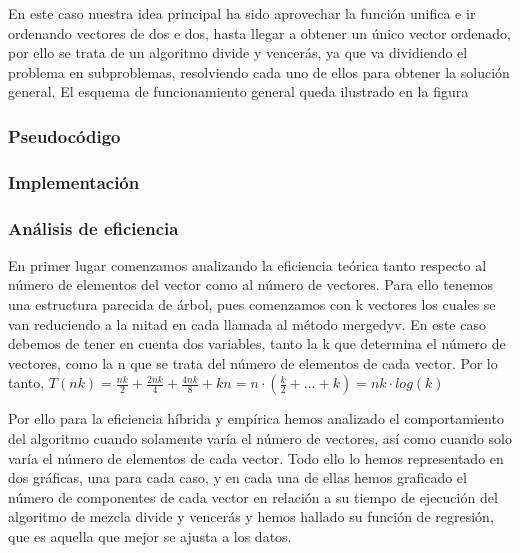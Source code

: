 En este caso nuestra idea principal ha sido aprovechar la función unifica e ir ordenando vectores de dos e dos,
hasta llegar a obtener un único vector ordenado, por ello se trata de un algoritmo divide y vencerás, ya que va dividiendo 
el problema en subproblemas, resolviendo cada uno de ellos para obtener la solución general. El esquema de 
funcionamiento general queda ilustrado en la figura 

\begin{figure}
\end{figure}

\subsubsection{Pseudocódigo}



\subsubsection{Implementación}



\subsubsection{Análisis de eficiencia}

En primer lugar comenzamos analizando la eficiencia teórica tanto respecto al número de elementos del vector como al número de vectores.
Para ello tenemos una estructura parecida de árbol, pues comenzamos con k vectores los cuales se van reduciendo a la mitad en cada llamada al método mergedyv.
En este caso debemos de tener en cuenta dos variables, tanto la k que determina el número de vectores, como la n que se trata del número de elementos de cada vector.
Por lo tanto, $T(nk) = \frac{nk}{2} + \frac{2nk}{4} + \frac{4nk}{8} + kn = n \cdot (\frac{k}{2} +\dots +k)= nk \cdot log(k) $

Por ello para la eficiencia híbrida y empírica hemos analizado el comportamiento del algoritmo cuando solamente varía el número de vectores, así como cuando solo varía el número de 
elementos de cada vector. 
Todo ello lo hemos representado en dos gráficas, una para cada caso, y en cada una de ellas hemos graficado el número de componentes de cada vector en relación a su tiempo de ejecución del algoritmo de mezcla
divide y vencerás y hemos hallado su función de regresión, que es aquella que mejor se ajusta a los datos.

